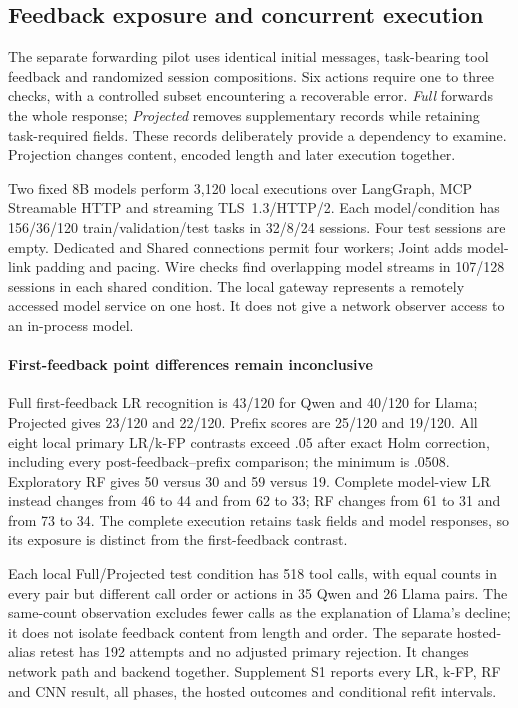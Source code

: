 \subsection{Feedback exposure and concurrent execution}\label{sec:live-study}
The separate forwarding pilot uses identical initial messages, task-bearing tool feedback and randomized session compositions. Six actions require one to three checks, with a controlled subset encountering a recoverable error. \emph{Full} forwards the whole response; \emph{Projected} removes supplementary records while retaining task-required fields. These records deliberately provide a dependency to examine. Projection changes content, encoded length and later execution together.

Two fixed 8B models perform 3,120 local executions over LangGraph, MCP Streamable HTTP and streaming TLS~1.3/HTTP/2. Each model/condition has 156/36/120 train/validation/test tasks in 32/8/24 sessions. Four test sessions are empty. Dedicated and Shared connections permit four workers; Joint adds model-link padding and pacing. Wire checks find overlapping model streams in 107/128 sessions in each shared condition. The local gateway represents a remotely accessed model service on one host. It does not give a network observer access to an in-process model.

\paragraph{First-feedback point differences remain inconclusive}
Full first-feedback LR recognition is 43/120 for Qwen and 40/120 for Llama; Projected gives 23/120 and 22/120. Prefix scores are 25/120 and 19/120. All eight local primary LR/k-FP contrasts exceed .05 after exact Holm correction, including every post-feedback--prefix comparison; the minimum is .0508. Exploratory RF gives 50 versus 30 and 59 versus 19. Complete model-view LR instead changes from 46 to 44 and from 62 to 33; RF changes from 61 to 31 and from 73 to 34. The complete execution retains task fields and model responses, so its exposure is distinct from the first-feedback contrast.

Each local Full/Projected test condition has 518 tool calls, with equal counts in every pair but different call order or actions in 35 Qwen and 26 Llama pairs. The same-count observation excludes fewer calls as the explanation of Llama's decline; it does not isolate feedback content from length and order. The separate hosted-alias retest has 192 attempts and no adjusted primary rejection. It changes network path and backend together. Supplement S1 reports every LR, k-FP, RF and CNN result, all phases, the hosted outcomes and conditional refit intervals.

